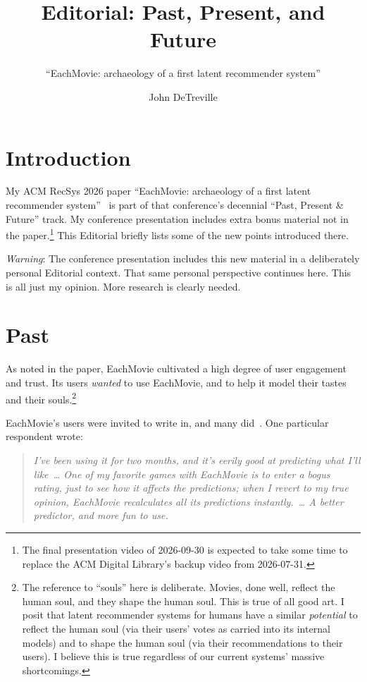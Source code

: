 \documentclass[nonacm,manuscript,screen,microtype={protrusion=true,expansion,kerning,spacing}]{acmart}
\begin{document}
\title{Editorial: Past, Present, and Future}
\subtitle{``EachMovie: archaeology of a first latent recommender system''}
\author{John DeTreville}

\maketitle{}

\section*{Introduction}

My ACM RecSys 2026 paper ``EachMovie: archaeology of a first latent recommender system''~\cite{DeTreville2026EachMovie_paper} is part of that conference's decennial ``Past, Present \& Future'' track. My conference presentation includes extra bonus material not in the paper.\footnote{The final presentation video of 2026-09-30 is expected to take some time to replace the ACM Digital Library's backup video from 2026-07-31.} This Editorial briefly lists some of the new points introduced there.

\emph{Warning}: The conference presentation includes this new material in a deliberately personal Editorial context. That same personal perspective continues here. This is all just my opinion. More research is clearly needed.

\section{Past}

As noted in the paper, EachMovie cultivated a high degree of user engagement and trust. Its users \emph{wanted} to use EachMovie, and to help it model their tastes and their souls.\footnote{The reference to ``souls'' here is deliberate. Movies, done well, reflect the human soul, and they shape the human soul. This is true of all good art. I posit that latent recommender systems for humans have a similar \emph{potential} to reflect the human soul (via their users' votes as carried into its internal models) and to shape the human soul (via their recommendations to their users). I believe this is true regardless of our current systems' massive shortcomings.}

EachMovie's users were invited to write in, and many did~\cite{EachMovieMailbag}. One particular respondent wrote:

\begin{quote}
  \emph{\large I've been using it for two months, and it's eerily good at predicting what I'll like~\ldots{} One of my favorite games with EachMovie is to enter a bogus rating, just to see how it affects the predictions; when I revert to my true opinion, EachMovie recalculates all its predictions instantly.~\ldots{} A better predictor, and more fun to use.~\cite{vanLeunen1996_mailbag}}
\end{quote}
\end{document}
